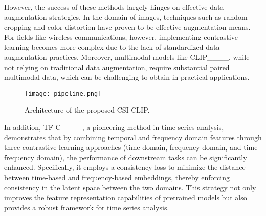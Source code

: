 However, the success of these methods largely hinges on effective data augmentation strategies. In the domain of images, techniques such as random cropping and color distortion have proven to be effective augmentation means. For fields like wireless communications, however, implementing contrastive learning becomes more complex due to the lack of standardized data augmentation practices. Moreover, multimodal models like CLIP____, while not relying on traditional data augmentation, require substantial paired multimodal data, which can be challenging to obtain in practical applications.

\begin{figure*}[tbp]
\centering\texttt{[image: pipeline.png]}
\caption{Architecture of the proposed CSI-CLIP.}
\label{fig:pipeline}
\end{figure*}

In addition, TF-C____, a pioneering method in time series analysis, demonstrates that by combining temporal and frequency domain features through three contrastive learning approaches (time domain, frequency domain, and time-frequency domain), the performance of downstream tasks can be significantly enhanced. Specifically, it employs a consistency loss to minimize the distance between time-based and frequency-based embeddings, thereby enforcing consistency in the latent space between the two domains. This strategy not only improves the feature representation capabilities of pretrained models but also provides a robust framework for time series analysis.